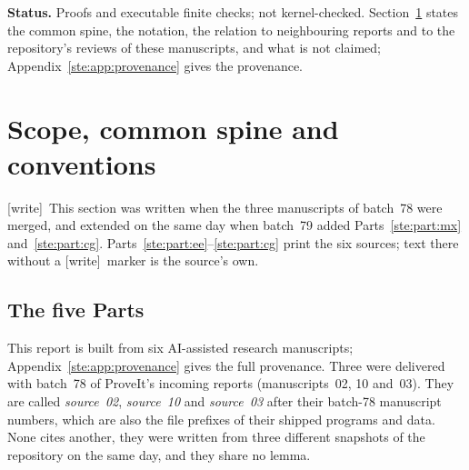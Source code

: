 \documentclass[11pt,letterpaper]{article}
\theoremstyle{definition}
\theoremstyle{remark}
\newcommand{\wtag}{\textup{[write]}}
\begin{document}
\begin{titlepage}
\begin{abstract}
Part~III (source~03) turns a natural arithmetic circuit into a diagonal Hamiltonian $H=(1+\sum_in_i)Q$ of degree at most five whose zero states biject with the witnesses and whose positive spectrum is effectively confined. Compact resolvent and finite thermal trace are equivalent to finite witness multiplicity and are undecidable on a padded universal family; a uniformly computable critical fugacity $t_*$ satisfies $t_*<1$ exactly on halting inputs.

Part~IV (source~11) realizes every nonzero rational polynomial $P$ with $r(P)+1$ states and commuting, strictly positive doubly stochastic matrices; on one fixed alphabet, exact arrival of one coordinate at its equilibrium value is computably enumerable complete.

Part~V (sources~12 and~13, one theorem by two routes) gives uniformly coercive operators $\alpha I-A$ whose Green data have finite support and are rational exactly on halting inputs.

The report is AI-assisted and unrefereed; nothing in it is formalized in Lean or Rocq, and priority is not certified for any Part.
\end{abstract}
\vfill
\noindent\small\textbf{Status.} Proofs and executable finite checks; not kernel-checked. Section~\ref{ste:sec:front} states the common spine, the notation, the relation to neighbouring reports and to the repository's reviews of these manuscripts, and what is not claimed; Appendix~\ref{ste:app:provenance} gives the provenance.
\end{titlepage}
\hypersetup{pageanchor=true}

\tableofcontents
\newpage

\section{Scope, common spine and conventions}\label{ste:sec:front}

\wtag\ This section was written when the three manuscripts of batch~78 were merged, and extended on the same day when batch~79 added Parts~\ref{ste:part:mx} and~\ref{ste:part:cg}. Parts~\ref{ste:part:ee}--\ref{ste:part:cg} print the six sources; text there without a \wtag\ marker is the source's own.

\subsection{The five Parts}\label{ste:sec:parts}

This report is built from six AI-assisted research manuscripts; Appendix~\ref{ste:app:provenance} gives the full provenance. Three were delivered with batch~78 of ProveIt's incoming reports (manuscripts~02, 10 and~03). They are called \emph{source~02}, \emph{source~10} and \emph{source~03} after their batch-78 manuscript numbers, which are also the file prefixes of their shipped programs and data. None cites another, they were written from three different snapshots of the repository on the same day, and they share no lemma.
\end{document}
